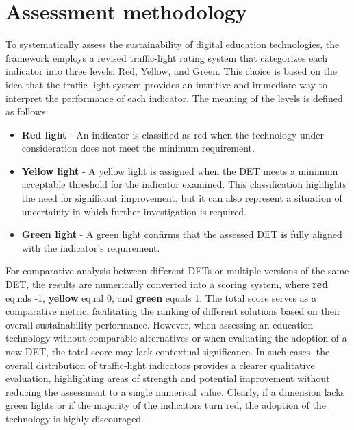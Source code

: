 \section{Assessment methodology}
\label{sec:3.3_assessment}
To systematically assess the sustainability of digital education technologies, the framework employs a revised traffic-light rating system that categorizes each indicator into three levels: Red, Yellow, and Green. This choice is based on the idea that the traffic-light system provides an intuitive and immediate way to interpret the performance of each indicator. The meaning of the levels is defined as follows:
\begin{itemize}[noitemsep, topsep=4pt, parsep=0pt, partopsep=0pt]
    \item \textbf{Red light} - An indicator is classified as red when the technology under consideration does not meet the minimum requirement.
    \item \textbf{Yellow light} - A yellow light is assigned when the DET meets a minimum acceptable threshold for the indicator examined. This classification highlights the need for significant improvement, but it can also represent a situation of uncertainty in which further investigation is required.
    \item \textbf{Green light} - A green light confirms that the assessed DET is fully aligned with the indicator's requirement.
\end{itemize}

For comparative analysis between different DETs or multiple versions of the same DET, the results are numerically converted into a scoring system, where \textbf{red} equals -1, \textbf{yellow} equal 0, and \textbf{green} equals 1. The total score serves as a comparative metric, facilitating the ranking of different solutions based on their overall sustainability performance. However, when assessing an education technology without comparable alternatives or when evaluating the adoption of a new DET, the total score may lack contextual significance. In such cases, the overall distribution of traffic-light indicators provides a clearer qualitative evaluation, highlighting areas of strength and potential improvement without reducing the assessment to a single numerical value. Clearly, if a dimension lacks green lights or if the majority of the indicators turn red, the adoption of the technology is highly discouraged.



